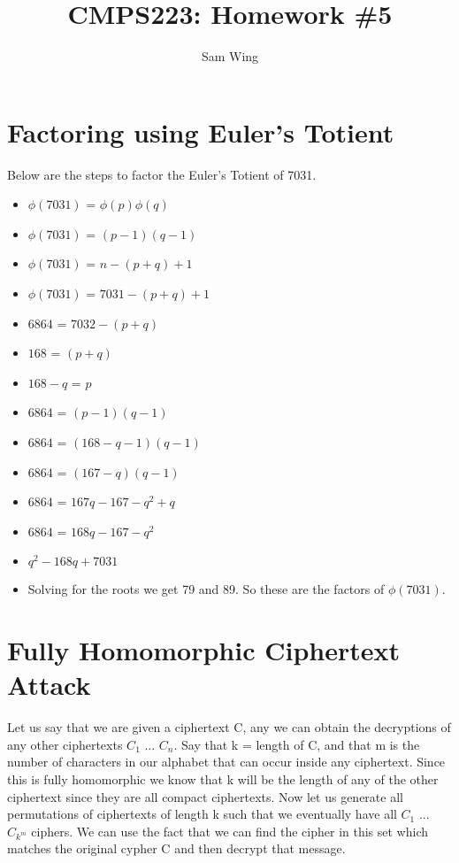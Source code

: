 \documentclass[11pt]{amsart}
\title{CMPS223: Homework \#5}
\author{Sam Wing}
\begin{document}
\maketitle
\section{Factoring using Euler's Totient}

Below are the steps to factor the Euler's Totient of 7031.

\begin{itemize}
	\item $\phi (7031)$ = $\phi(p)\phi(q)$
	\item $\phi (7031)$ = $(p-1)(q-1)$
	\item $\phi (7031)$ = $n - (p+q) + 1$
	\item $\phi (7031)$ = $7031 - (p + q) + 1$
	\item $6864$ = $7032 - (p + q) $
	\item $168$ = $(p + q)$
	\item $168 - q$ = $p$
	\item $6864$ = $(p - 1)(q - 1) $
	\item $6864$ = $(168 - q - 1)(q - 1) $
	\item $6864$ = $(167 - q )(q - 1) $	
	\item $6864$ = $167q - 167 - q^2 + q$
	\item $6864$ = $168q - 167 - q^2$
	\item $q^2 - 168q + 7031$
	\item Solving for the roots we get 79 and 89.  So these are the factors of $\phi(7031)$.  
\end{itemize}


\section{Fully Homomorphic Ciphertext Attack}


Let us say that we are given a ciphertext C, any we can obtain the decryptions of any other ciphertexts $C_1$ ... $C_n$.  Say that k = length of C, and that m is the number of characters in our alphabet that can occur inside any ciphertext.  Since this is fully homomorphic we know that k will be the length of any of the other ciphertext since they are all compact ciphertexts.  Now let us generate all permutations of ciphertexts of length k such that we eventually have all $C_1$ ... $C_{k^m}$ ciphers.  We can use the fact that we can find the cipher in this set which matches the original cypher C and then decrypt that message.  
\end{document}
